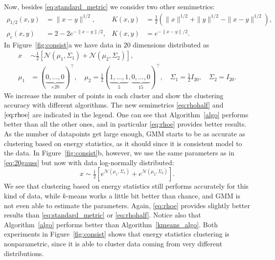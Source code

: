 \documentclass[aps,preprint,nofootinbib,floatfix]{revtex4-1}
\newcommand\kk{K}
\begin{document}
Now, besides \eqref{eq:standard_metric} we consider two other semimetrics:
\begin{align}
\rho_{1/2}(x,y) &= \| x-y \|^{1/2}, & \kk(x,y) &= \tfrac{1}{2} \left( 
\| x \|^{1/2} + \| y \|^{1/2} 
- \| x-y \|^{1/2} \right), \label{eq:rhohalf}\\
\rho_{e}(x,y) &= 2 - 2 e^{-\| x- y\|/2}, & \kk(x,y) &= e^{-\| x-y\|/2}.
\label{eq:rhoe}
\end{align}
In Figure~\ref{fig:consist}a we have data in $20$ dimensions distributed as
\begin{equation}
\label{eq:20gauss}
\begin{split}
x &\sim \tfrac{1}{2}\left[ \mathcal{N}(\mu_1,\Sigma_1) + \mathcal{N}(\mu_2,
\Sigma_2) \right], \\
\mu_1 &= (\underbrace{0,\dotsc,0}_{\times 20})^\top ,\quad
\mu_2 = \tfrac{1}{2} 
(\underbrace{1,\dotsc,1}_{5},\underbrace{0,\dotsc,0}_{15})^\top, \quad
\Sigma_1 = \tfrac{1}{2} I_{20},  \quad
\Sigma_2 = I_{20}.
\end{split}
\end{equation}
We increase the number of points in each cluster and show the clustering
accuracy with different algorithms. The new semimetrics \eqref{eq:rhohalf}
and $\eqref{eq:rhoe}$ are indicated in the legend. One can see that
Algorithm~\ref{algo} performs better than all the other ones, and in 
particular \eqref{eq:rhoe} provides better results.
As the number of datapoints 
get large enough, GMM starts to be as accurate as clustering
based on energy statistics, as it should since it is 
consistent model to the data. In Figure~\ref{fig:consist}b, however, we
use the same parameters as in \eqref{eq:20gauss} but now with data
log-normally distributed:
\begin{equation}
\label{eq:20loggauss}
x \sim \tfrac{1}{2}\left[ e^{\mathcal{N}(\mu_1,\Sigma_1)}
+ e^{\mathcal{N}(\mu_2, \Sigma_2)}\right].
\end{equation}
We see that clustering based on energy statistics still performs accurately
for this kind of data, while $k$-means works a little bit better than chance,
and GMM is not even able to estimate the parameters. Again, \eqref{eq:rhoe}
provides slightly better results than \eqref{eq:standard_metric} or
\eqref{eq:rhohalf}. Notice also that Algorithm~\ref{algo} performs better
than Algorithm~\ref{kmeans_algo}. Both experiments in Figure~\ref{fig:consist}
shows that energy statistics clustering is nonparametric, since it is able
to cluster data coming from very different distributions.
\end{document}
